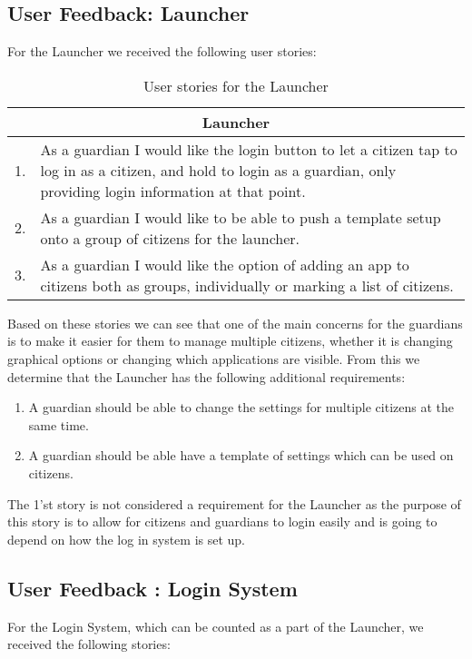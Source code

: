\subsection{User Feedback: Launcher}
For the Launcher we received the following user stories:

\begin{table}[H]
\begin{tabular}{|c|p{12.5cm}|}
\hline 
\multicolumn{2}{|c|}{Launcher}\\ \hline 
1. & As a guardian I would like the login button to let a citizen tap to log in
as a citizen, and hold to login as a guardian, only providing login information
at that point.\\\hline
2. & As a guardian I would like to be able to push a template setup onto a group
of citizens for the launcher.\\\hline
3. & As a guardian I would like the option of adding an app to citizens both as
groups, individually or marking a list of citizens.\\\hline
\end{tabular}
\caption{User stories for the Launcher}
\label{UserStoriesLauncher}
\end{table}

Based on these stories we can see that one of the main concerns for the
guardians is to make it easier for them to manage multiple citizens, whether it
is changing graphical options or changing which applications are visible. From
this we determine that the Launcher has the following additional requirements:

\begin{enumerate}
  \item A guardian should be able to change the settings for multiple
  citizens at the same time.
  \item A guardian should be able have a template of settings which can be used
  on citizens.
\end{enumerate}
The 1'st story is not considered a requirement for the Launcher as the purpose
of this story is to allow for citizens and guardians to login easily and is
going to depend on how the log in system is set up.\nl

\subsection{User Feedback : Login System}
For the Login System, which can be counted as a part of the Launcher, we
received the following stories:

